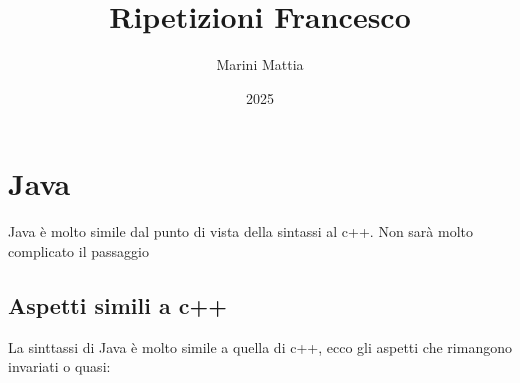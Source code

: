 

\title{Ripetizioni Francesco}
\author{Marini Mattia}
\date{2025}
\lstset{
frame = none
  }


\maketitle
{}
\tableofcontents

\listofexercises

\newpage


\section{Java}
Java è molto simile dal punto di vista della sintassi al c++. Non sarà molto complicato il passaggio
\subsection{Aspetti simili a c++}
La sinttassi di Java è molto simile a quella di c++, ecco gli aspetti che rimangono invariati o quasi:
